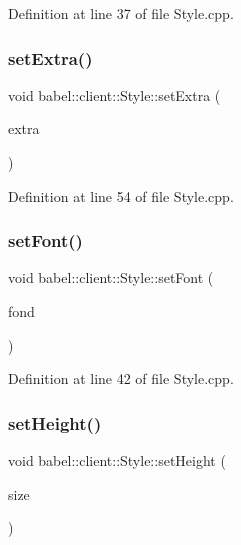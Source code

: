Definition at line 37 of file Style.\+cpp.

\mbox{\label{classbabel_1_1client_1_1_style_abe1b954b3e05ed7b548c30a0b5927ea4}} 
\subsubsection{\texorpdfstring{set\+Extra()}{setExtra()}}
{\footnotesize\ttfamily void babel\+::client\+::\+Style\+::set\+Extra (\begin{DoxyParamCaption}\item[{Q\+String}]{extra }\end{DoxyParamCaption})}



Definition at line 54 of file Style.\+cpp.

\mbox{\label{classbabel_1_1client_1_1_style_a92fc3392b44a618a45e916b81b2e2718}} 
\subsubsection{\texorpdfstring{set\+Font()}{setFont()}}
{\footnotesize\ttfamily void babel\+::client\+::\+Style\+::set\+Font (\begin{DoxyParamCaption}\item[{Q\+String}]{fond }\end{DoxyParamCaption})}



Definition at line 42 of file Style.\+cpp.

\mbox{\label{classbabel_1_1client_1_1_style_ad0c007eb7859af1107475418289f3360}} 
\subsubsection{\texorpdfstring{set\+Height()}{setHeight()}}
{\footnotesize\ttfamily void babel\+::client\+::\+Style\+::set\+Height (\begin{DoxyParamCaption}\item[{int}]{size }\end{DoxyParamCaption})}



